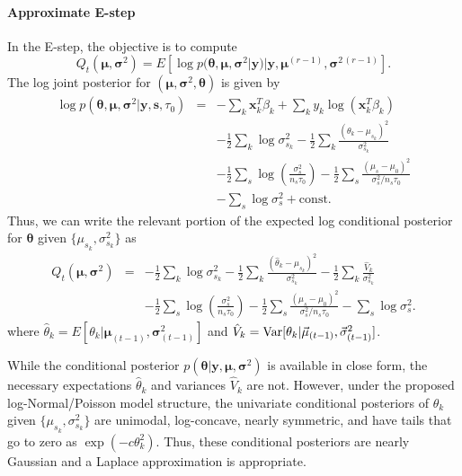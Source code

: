 \paragraph{Approximate E-step}
%
In the E-step, the objective is to compute 
\begin{equation} 
  Q_t(\bm \mu, \bm \sigma^2) = E \left[ \log p(\bm \theta, \bm \mu, \bm \sigma^2 | \bm y ) | \bm y, \bm \mu^{(r-1)}, \bm \sigma^{2\,(r-1)} \right].
\end{equation}
%
The log joint posterior for $(\bm \mu, \bm \sigma^2, \bm \theta)$ is given by
\begin{eqnarray}\label{supp:nucleosomes:eq:logPosterior}
 \log p(\bm \theta, \bm \mu, \bm \sigma^2 | \bm y, \bm s, \tau_0) &=& -\sum_k
\bm x_k^T \beta_k + \sum_k y_k \log \left( \bm x_k^T \beta_k \right)  \\
 \nonumber && - \frac{1}{2} \sum_k \log \sigma^2_{s_k} -
  \frac{1}{2} \sum_k \frac{(\theta_k - \mu_{s_k})^2}{\sigma^2_{s_k}} \\
 \nonumber && - \frac{1}{2} \sum_s \log \left( \frac{\sigma^2_{s}}{n_{s} \tau_0}
  \right) - \frac{1}{2} \sum_s \frac{(\mu_s - \mu_0)^2}{\sigma^2_{s} / n_{s} \tau_0} \\
  \nonumber && - \sum_s \log \sigma^2_s + \mathrm{const}.
\end{eqnarray}
%
Thus, we can write the relevant portion of the expected log conditional
posterior for $\bm \theta$ given $\{\mu_{s_k}, \sigma^2_{s_k}\}$ as
\begin{eqnarray}
 Q_t(\bm \mu, \bm \sigma^2) &=& - \frac{1}{2} \sum_k \log \sigma^2_{s_k} -
  \frac{1}{2} \sum_k \frac{(\hat{\theta}_k - \mu_{s_k})^2}{\sigma^2_{s_k}}
 - \frac{1}{2} \sum_k \frac{\hat{V}_k}{\sigma^2_{s_k}} \\
 \nonumber && - \frac{1}{2} \sum_s \log \left( \frac{\sigma^2_{s}}{n_{s} \tau_0}
  \right) - \frac{1}{2} \sum_s \frac{(\mu_s - \mu_0)^2}{\sigma^2_{s} / n_{s} \tau_0}
 - \sum_s \log \sigma^2_s.
\end{eqnarray}
where $\hat{\theta}_k = E[ \theta_k | \bm \mu_{(t-1)}, \bm \sigma^2_{(t-1)} ]$
and $\hat{V}_k = \operatorname{Var} [ \theta_k | \vec \mu_{(t-1)}, \vec \sigma^2_{(t-1)} ]$. 

While the conditional posterior $p(\bm \theta | \bm y, \bm \mu, \bm \sigma^2 )$ is available in close form,  the necessary  expectations $\hat{\theta}_k$ and variances $\hat V_k$ are not.
However, under the proposed log-Normal/Poisson model structure, the univariate conditional posteriors of $\theta_k$ given $\{\mu_{s_k}, \sigma^2_{s_k}\}$ are unimodal, log-concave, nearly symmetric, and have tails that go to zero as $\exp(-c \theta_k^2)$. 
Thus, these conditional posteriors are nearly Gaussian and a Laplace approximation is appropriate. 

